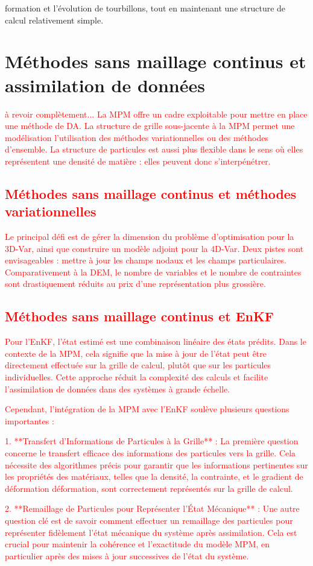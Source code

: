 formation et l'évolution de tourbillons, tout en maintenant une structure de calcul relativement simple.

\section{Méthodes sans maillage continus et assimilation de données}
\textcolor{red}{ à revoir complètement...
    La MPM offre un cadre exploitable pour mettre en place une méthode de DA.
    La structure de grille sous-jacente à la MPM permet une modélisation l'utilisation des méthodes variationnelles ou des méthodes d'ensemble. La structure de particules est aussi plus flexible dans le sens où elles représentent une densité de matière : elles peuvent donc s'interpénétrer.

    \subsection{Méthodes sans maillage continus et méthodes variationnelles}
    Le principal défi est de gérer la dimension du problème d'optimisation pour la 3D-Var, ainsi que construire un modèle adjoint pour la 4D-Var.
    Deux pistes sont envisageables : mettre à jour les champs nodaux et les champs particulaires. Comparativement à la DEM, le nombre de variables et le nombre de contraintes sont drastiquement réduits au prix d'une représentation plus grossière.

    \subsection{Méthodes sans maillage continus et EnKF}
    Pour l'EnKF, l'état estimé est une combinaison linéaire des états prédits. Dans le contexte de la MPM, cela signifie que la mise à jour de l'état peut être directement effectuée sur la grille de calcul, plutôt que sur les particules individuelles. Cette approche réduit la complexité des calculs et facilite l'assimilation de données dans des systèmes à grande échelle.

    Cependant, l'intégration de la MPM avec l'EnKF soulève plusieurs questions importantes :

    1. **Transfert d'Informations de Particules à la Grille** : La première question concerne le transfert efficace des informations des particules vers la grille. Cela nécessite des algorithmes précis pour garantir que les informations pertinentes sur les propriétés des matériaux, telles que la densité, la contrainte, et le gradient de déformation déformation, sont correctement représentés sur la grille de calcul.

    2. **Remaillage de Particules pour Représenter l'État Mécanique** : Une autre question clé est de savoir comment effectuer un remaillage des particules pour représenter fidèlement l'état mécanique du système après assimilation. Cela est crucial pour maintenir la cohérence et l'exactitude du modèle MPM, en particulier après des mises à jour successives de l'état du système.}

